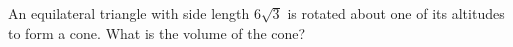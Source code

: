 An equilateral triangle with side length $6\sqrt3$ is rotated about one of its altitudes to form a cone. What is the volume of the cone?

